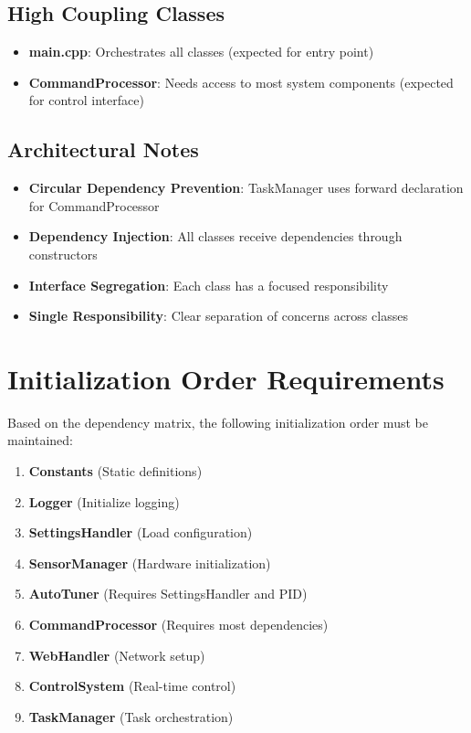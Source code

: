 \documentclass[12pt,a4paper]{article}
\begin{document}
\subsection{High Coupling Classes}
\begin{itemize}
    \item \textbf{main.cpp}: Orchestrates all classes (expected for entry point)
    \item \textbf{CommandProcessor}: Needs access to most system components (expected for control interface)
\end{itemize}

\subsection{Architectural Notes}
\begin{itemize}
    \item \textbf{Circular Dependency Prevention}: TaskManager uses forward declaration for CommandProcessor
    \item \textbf{Dependency Injection}: All classes receive dependencies through constructors
    \item \textbf{Interface Segregation}: Each class has a focused responsibility
    \item \textbf{Single Responsibility}: Clear separation of concerns across classes
\end{itemize}

\section{Initialization Order Requirements}

Based on the dependency matrix, the following initialization order must be maintained:

\begin{enumerate}
    \item \textbf{Constants} (Static definitions)
    \item \textbf{Logger} (Initialize logging)
    \item \textbf{SettingsHandler} (Load configuration)
    \item \textbf{SensorManager} (Hardware initialization)
    \item \textbf{AutoTuner} (Requires SettingsHandler and PID)
    \item \textbf{CommandProcessor} (Requires most dependencies)
    \item \textbf{WebHandler} (Network setup)
    \item \textbf{ControlSystem} (Real-time control)
    \item \textbf{TaskManager} (Task orchestration)
\end{enumerate}
\end{document}
